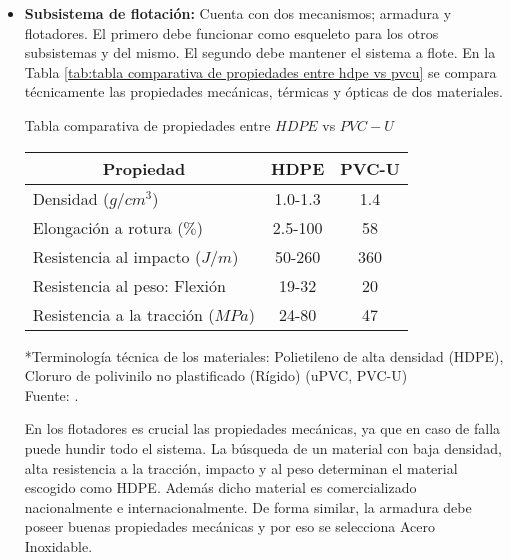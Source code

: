 \begin{itemize}
	
	\item \textbf{Subsistema de flotación:} Cuenta con dos mecanismos; armadura y flotadores. El primero debe funcionar como esqueleto para los otros subsistemas y del mismo. El segundo debe mantener el sistema a flote. En la Tabla \ref{tab:tabla comparativa de propiedades entre hdpe vs pvcu} se compara técnicamente las propiedades mecánicas, térmicas y ópticas de dos materiales.
	
	\begin{mytable}[H]
		\centering
		\caption{Tabla comparativa de propiedades entre $HDPE$ vs $PVC-U$}
		\label{tab:tabla comparativa de propiedades entre hdpe vs pvcu}
		\begin{tabular}{|l|c|c|}
			\hline
			\multicolumn{1}{|c|}{\textbf{Propiedad}} & \textbf{HDPE} & \textbf{PVC-U} \\ \hline
			Densidad ($g/cm^3$) & 1.0-1.3 & 1.4 \\ \hline
			Elongación a rotura ($\%$) & 2.5-100 & 58 \\ \hline
			Resistencia al impacto ($J/m$) & 50-260 & 360 \\ \hline
			Resistencia al peso: Flexión & 19-32 & 20 \\ \hline
			Resistencia a la tracción ($MPa$) & 24-80 & 47 \\ \hline
		\end{tabular}
		\begin{flushleft}
			*Terminología técnica de los materiales: Polietileno de alta densidad (HDPE), Cloruro de polivinilo no plastificado (Rígido) (uPVC, PVC-U)\\		
			Fuente: \cite{Brydson1999,Berins1991,Harper2000,MakeItFrom2020}.
		\end{flushleft}
	\end{mytable}
	
	En los flotadores es crucial las propiedades mecánicas, ya que en caso de falla puede hundir todo el sistema. La búsqueda de un material con baja densidad, alta resistencia a la tracción, impacto y al peso determinan el material escogido como HDPE. Además dicho material es comercializado nacionalmente e internacionalmente. De forma similar, la armadura debe poseer buenas propiedades mecánicas y por eso se selecciona Acero Inoxidable.
	
\end{itemize}


